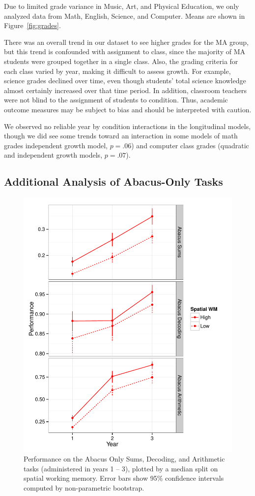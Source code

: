 \documentclass[11pt]{article}
\begin{document}
Due to limited grade variance in Music, Art, and Physical Education, we only analyzed data from Math, English, Science, and Computer. Means are shown in Figure~\ref{fig:grades}. 

There was an overall trend in our dataset to see higher grades for the MA group, but this trend is confounded with assignment to class, since the majority of MA students were grouped together in a single class. Also, the grading criteria for each class varied by year, making it difficult to assess growth. For example, science grades declined over time, even though students' total science knowledge almost certainly increased over that time period. In addition, classroom teachers were not blind to the assignment of students to condition. Thus, academic outcome measures may be subject to bias and should be interpreted with caution. 

We observed no reliable year by condition interactions in the longitudinal models, though we did see some trends toward an interaction in some models of math grades independent growth model, $p = .06$) and computer class grades (quadratic and independent growth models, $p = .07$). 
 
\subsection{Additional Analysis of Abacus-Only Tasks}

\begin{figure}[H]
\begin{center}
\includegraphics[width=4.5in]{figures/abacus_by_swm.pdf}
\end{center}
\caption{Performance on the Abacus Only Sums, Decoding, and Arithmetic tasks (administered in years 1 -- 3), plotted by a median split on spatial working memory. Error bars show 95\% confidence intervals computed by non-parametric bootstrap.}
\label{fig:abacusonly}
\end{figure}
\end{document}
